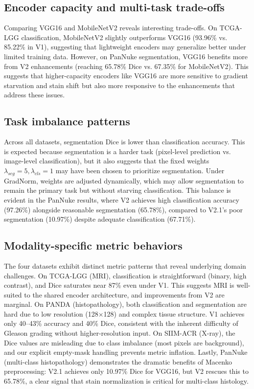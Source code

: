 \documentclass[conference,a4paper]{IEEEtran}
\begin{document}
\subsection{Encoder capacity and multi-task trade-offs}
Comparing VGG16 and MobileNetV2 reveals interesting trade-offs. On TCGA-LGG classification, MobileNetV2 slightly outperforms VGG16 (93.96\% vs. 85.22\% in V1), suggesting that lightweight encoders may generalize better under limited training data. However, on PanNuke segmentation, VGG16 benefits more from V2 enhancements (reaching 65.78\% Dice vs. 67.35\% for MobileNetV2). This suggests that higher-capacity encoders like VGG16 are more sensitive to gradient starvation and stain shift but also more responsive to the enhancements that address these issues.

\subsection{Task imbalance patterns}
Across all datasets, segmentation Dice is lower than classification accuracy. This is expected because segmentation is a harder task (pixel-level prediction vs. image-level classification), but it also suggests that the fixed weights $\lambda_{seg}=5, \lambda_{cls}=1$ may have been chosen to prioritize segmentation. Under GradNorm, weights are adjusted dynamically, which may allow segmentation to remain the primary task but without starving classification. This balance is evident in the PanNuke results, where V2 achieves high classification accuracy (97.26\%) alongside reasonable segmentation (65.78\%), compared to V2.1's poor segmentation (10.97\%) despite adequate classification (67.71\%).

\subsection{Modality-specific metric behaviors}
The four datasets exhibit distinct metric patterns that reveal underlying domain challenges. On TCGA-LGG (MRI), classification is straightforward (binary, high contrast), and Dice saturates near 87\% even under V1. This suggests MRI is well-suited to the shared encoder architecture, and improvements from V2 are marginal. On PANDA (histopathology), both classification and segmentation are hard due to low resolution (128×128) and complex tissue structure. V1 achieves only 40--43\% accuracy and 40\% Dice, consistent with the inherent difficulty of Gleason grading without higher-resolution input. On SIIM-ACR (X-ray), the Dice values are misleading due to class imbalance (most pixels are background), and our explicit empty-mask handling prevents metric inflation. Lastly, PanNuke (multi-class histopathology) demonstrates the dramatic benefits of Macenko preprocessing: V2.1 achieves only 10.97\% Dice for VGG16, but V2 rescues this to 65.78\%, a clear signal that stain normalization is critical for multi-class histology.
\end{document}
